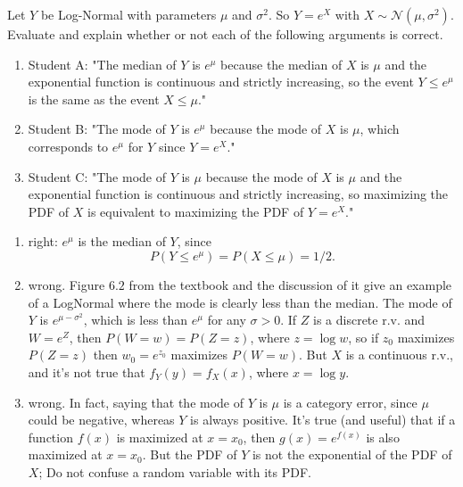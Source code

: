
\setcounter{theorem}{8}
\begin{exercise} [BH.6.9]
    Let $Y$ be Log-Normal with parameters $\mu$ and $\sigma^2$. So $Y=e^X$ with $X \sim \mathcal{N}\left(\mu, \sigma^2\right)$. Evaluate and explain whether or not each of the following arguments is correct.
	\begin{enumerate}
		\item Student A: "The median of $Y$ is $e^\mu$ because the median of $X$ is $\mu$ and the exponential function is continuous and strictly increasing, so the event $Y \leq e^\mu$ is the same as the event $X \leq \mu$."
		\item Student B: "The mode of $Y$ is $e^\mu$ because the mode of $X$ is $\mu$, which corresponds to $e^\mu$ for $Y$ since $Y=e^X$."
		\item Student C: "The mode of $Y$ is $\mu$ because the mode of $X$ is $\mu$ and the exponential function is continuous and strictly increasing, so maximizing the PDF of $X$ is equivalent to maximizing the PDF of $Y=e^X$."
	\end{enumerate}  
\begin{solution}
    \begin{enumerate}
        \item  right: $e^\mu$ is the median of $Y$, since
        $$
        P\left(Y \leq e^\mu\right)=P(X \leq \mu)=1 / 2 .
        $$
        \item  wrong. Figure $6.2$ from the textbook and the discussion of it give an example of a LogNormal where the mode is clearly less than the median. The mode of $Y$ is $e^{\mu-\sigma^2}$, which is less than $e^\mu$ for any $\sigma>0$.
        If $Z$ is a discrete r.v. and $W=e^Z$, then $P(W=w)=P(Z=z)$, where $z=\log w$, so if $z_0$ maximizes $P(Z=z)$ then $w_0=e^{z_0}$ maximizes $P(W=w)$. But $X$ is a continuous r.v., and it's not true that $f_Y(y)=f_X(x)$, where $x=\log y$.
        \item wrong. In fact, saying that the mode of $Y$ is $\mu$ is a category error, since $\mu$ could be negative, whereas $Y$ is always positive. It's true (and useful) that if a function $f(x)$ is maximized at $x=x_0$, then $g(x)=e^{f(x)}$ is also maximized at $x=x_0$. But the PDF of $Y$ is not the exponential of the PDF of $X$; Do not confuse a random variable with its PDF.
    \end{enumerate}
\end{solution}
\end{exercise}

